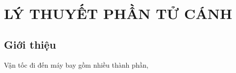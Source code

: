\documentclass[TRUC_THANG.tex]{subfiles}
\begin{document}
\chapter{LÝ THUYẾT PHẦN TỬ CÁNH}

\section{Giới thiệu}

Vận tốc đi đến máy bay gồm nhiều thành phần, 
\end{document}
